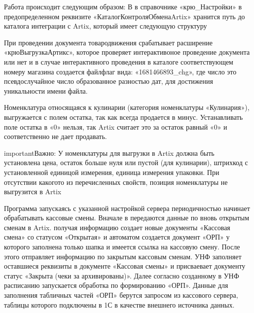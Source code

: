 \documentclass[a4paper,10pt,russian]{report}
\begin{document}
\begin{figure}[htbp]
\centering

\noindent{}
\end{figure}

\sphinxAtStartPar
Работа происходит следующим образом:
В  в справочнике «крю\_Настройки» в предопределенном реквизите «КаталогКонтроляОбменаArtix» хранится путь до каталога интеграции
с Artix, который имеет следующую структуру \sphinxhyphen{}

\begin{figure}[htbp]
\centering

\noindent{}
\end{figure}

\sphinxAtStartPar
При проведении документа товародвижения срабатывает расширение «крюВыгрузкаАртикс», которое проверяет интерактивоное проведение документа или нет и в случае
интерактивного проведения в каталоге соответствующем номеру магазина создается файл\sphinxhyphen{}флаг
вида:  «1681466893\_chg», где число это псевдослучайное число образованное разностью дат, для достижения уникальности имени файла.

\sphinxAtStartPar
Номенклатура относящаяся к кулинарии (категория номенклатуры «Кулинария»), выгружается с  полем остатка, так как всегда продается в минус. Устанавливать
поле остатка в «0» нельзя, так Artix считает это за остаток равный «0» и соответственно не дает продавать.

\begin{sphinxadmonition}{important}{Важно:}
\sphinxAtStartPar
У номенклатуры для выгрузки в Artix должна быть установлена цена, остаток больше нуля или пустой (для кулинарии), штрихкод с установленной единицой измерения,
единица измерения упаковки. При отсутствии какого\sphinxhyphen{}то из перечисленных свойств, позиция номенклатуры не выгрузится в Artix
\end{sphinxadmonition}

\sphinxAtStartPar
Программа  запускаясь с указанной настройкой сервера периодичностью начинает обрабатывать кассовые смены.
Вначале в  передаются данные по вновь открытым сменам в Artix.  получая информацию создает новые документы «Кассовая смена» со статусом
«Открытая» и автоматом создается документ «ОРП» у которого заполнена только шапка и имеется ссылка на кассовую смену.
После этого  отправляет информацию по закрытым кассовым сменам. УНФ заполняет оставшиеся реквизиты в документе «Кассовая смены» и присваевает
документу статус «Закрыта (чеки за архивированы)».
Далее согласно созданному в УНФ расписанию запускается обработка по формированию «ОРП». Данные для заполнения табличных частей «ОРП» берутся запросом из
кассового сервера, таблицы которого подключены в 1С в качестве внешнего источника данных.
\end{document}

